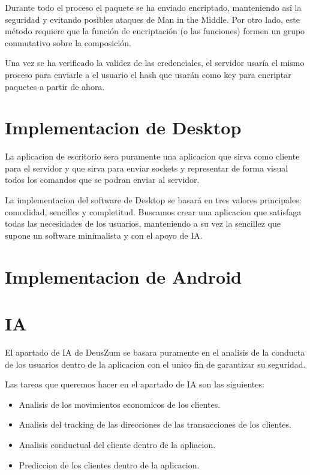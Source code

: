 \documentclass{article}
\theoremstyle{definition}
\begin{document}
Durante todo el proceso el paquete se ha enviado encriptado, manteniendo así la seguridad y evitando posibles ataques de Man in the Middle. Por otro lado, este método requiere que la función de encriptación (o las funciones) formen un grupo conmutativo sobre la composición.

Una vez se ha verificado la validez de las credenciales, el servidor usaría el mismo proceso para enviarle a el usuario el hash que usarán como key para encriptar paquetes a partir de ahora.


\section{Implementacion de Desktop}

La aplicacion de escritorio sera puramente una aplicacion que sirva como cliente para el servidor y que sirva para enviar sockets y representar de forma visual todos los comandos que se podran enviar al servidor.

La implementacion del software de Desktop se basará en tres valores principales: comodidad, sencilles y completitud. Buscamos crear una aplicacion que satisfaga todas las necesidades de los usuarios, manteniendo a su vez la sencillez que supone un software minimalista y con el apoyo de IA.




\section{Implementacion de Android}




\section{IA}

El apartado de IA de DeusZum se basara puramente en el analisis de la conducta de los usuarios dentro de la aplicacion con el unico fin de garantizar su seguridad.

Las tareas que queremos hacer en el apartado de IA son las siguientes:

\begin{itemize}
    \item Analisis de los movimientos economicos de los clientes.
    \item Analisis del tracking de las direcciones de las transacciones de los clientes.
    \item Analisis conductual del cliente dentro de la apliacion.
    \item Prediccion de los clientes dentro de la aplicacion.
\end{itemize}
\end{document}
